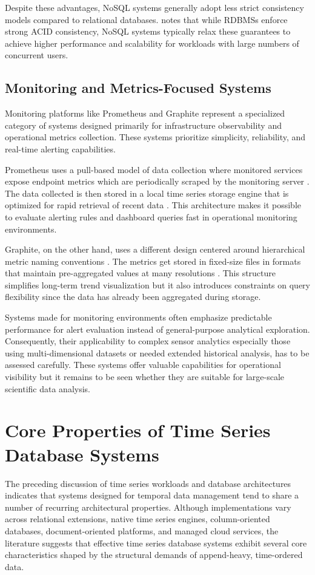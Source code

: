 Despite these advantages, NoSQL systems generally adopt less strict consistency models compared to relational databases. \cite{Taipalus_2024} notes that  while RDBMSs enforce strong ACID consistency, NoSQL systems typically relax  these guarantees to achieve higher performance and scalability for workloads with large numbers of concurrent users.


\subsection{Monitoring and Metrics-Focused Systems}
Monitoring platforms like Prometheus \cite{prometheus_overview} and Graphite \cite{graphite_overview} represent a specialized category of systems designed primarily for infrastructure observability and operational metrics collection. These systems prioritize simplicity, reliability, and real-time alerting capabilities.

Prometheus uses a pull-based model of data collection where monitored services expose endpoint metrics which are periodically scraped by the monitoring server \cite{prometheus_overview}. The data collected is then stored in a local time series storage engine that is optimized for rapid retrieval of recent data \cite{prometheus_storage}. This architecture makes it possible to evaluate alerting rules and dashboard queries fast in operational monitoring environments.

Graphite, on the other hand, uses a different design centered around hierarchical metric naming conventions \cite{graphite_overview}. The metrics get stored in fixed-size files in formats that maintain pre-aggregated values at many resolutions \cite{graphite_overview}. This structure simplifies long-term trend visualization but it also introduces constraints on query flexibility since the data has already been aggregated during storage.

Systems made for monitoring environments often emphasize predictable performance for alert evaluation instead of general-purpose analytical exploration. Consequently, their applicability to complex sensor analytics especially those using multi-dimensional datasets or needed extended historical analysis, has to be assessed carefully. These systems offer valuable capabilities for operational visibility but it remains to be seen whether they are suitable for large-scale scientific data analysis. 


\section{Core Properties of Time Series Database Systems}
The preceding discussion of time series workloads and database architectures indicates that systems designed for temporal data management tend to share a number of recurring architectural properties. Although implementations vary across relational extensions, native time series engines, column-oriented databases, document-oriented platforms, and managed cloud services, the literature suggests that effective time series database systems exhibit several core characteristics shaped by the structural demands of append-heavy, time-ordered data.

